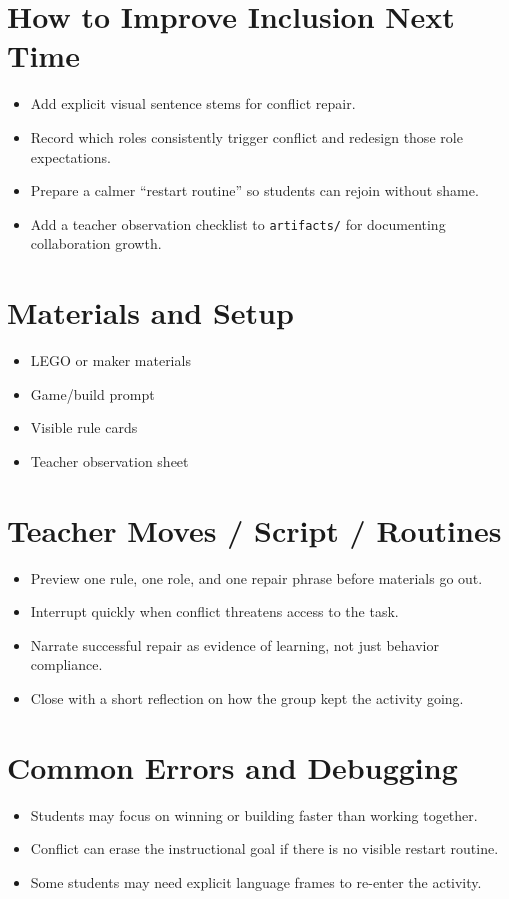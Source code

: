 \documentclass[11pt]{article}
\begin{document}
\section*{How to Improve Inclusion Next Time}
\begin{itemize}[leftmargin=*]
\item Add explicit visual sentence stems for conflict repair.
\item Record which roles consistently trigger conflict and redesign those role expectations.
\item Prepare a calmer “restart routine” so students can rejoin without shame.
\item Add a teacher observation checklist to \texttt{artifacts/} for documenting collaboration growth.
\end{itemize}

\section*{Materials and Setup}
\begin{itemize}[leftmargin=*]
\item LEGO or maker materials
\item Game/build prompt
\item Visible rule cards
\item Teacher observation sheet
\end{itemize}

\section*{Teacher Moves / Script / Routines}
\begin{itemize}[leftmargin=*]
\item Preview one rule, one role, and one repair phrase before materials go out.
\item Interrupt quickly when conflict threatens access to the task.
\item Narrate successful repair as evidence of learning, not just behavior compliance.
\item Close with a short reflection on how the group kept the activity going.
\end{itemize}

\section*{Common Errors and Debugging}
\begin{itemize}[leftmargin=*]
\item Students may focus on winning or building faster than working together.
\item Conflict can erase the instructional goal if there is no visible restart routine.
\item Some students may need explicit language frames to re-enter the activity.
\end{itemize}
\end{document}
